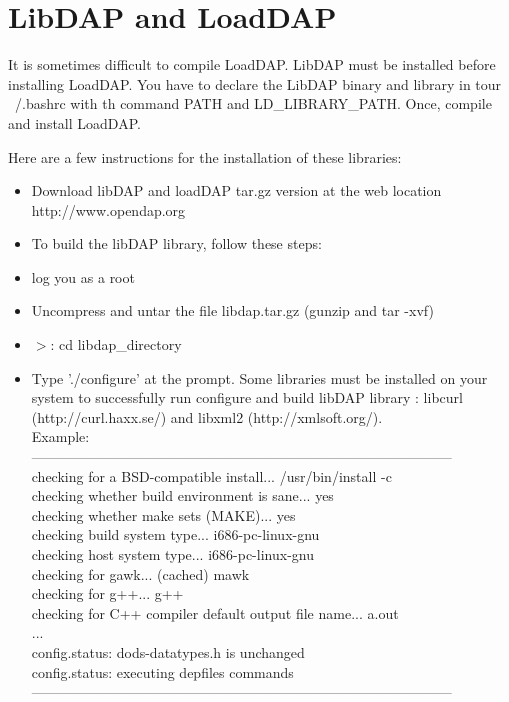 \section{LibDAP and  LoadDAP}\label{sec:libdap}
It is sometimes difficult to compile LoadDAP.  LibDAP must be installed before
installing LoadDAP. You have to declare the LibDAP binary and library in tour
~/.bashrc with th command PATH and LD\_LIBRARY\_PATH. Once, compile and install
LoadDAP.

Here are a few instructions for the installation of these libraries:\\
\begin{itemize}
\item Download libDAP and loadDAP tar.gz version at the web location
http://www.opendap.org
\item To build the libDAP library, follow these steps:\\
\item log you as a root
\item Uncompress and untar the file libdap.tar.gz (gunzip and tar -xvf)
\item $>$: cd libdap\_directory
\item Type './configure' at the prompt. Some libraries must be installed 
on your system to successfully run configure and build libDAP library : libcurl 
(http://curl.haxx.se/) and libxml2 (http://xmlsoft.org/).\\
Example:\\
------------------------------------------------------------------------------------------\\
checking for a BSD-compatible install... /usr/bin/install -c\\
checking whether build environment is sane... yes\\
checking whether make sets (MAKE)... yes\\
checking build system type... i686-pc-linux-gnu\\
checking host system type... i686-pc-linux-gnu\\
checking for gawk... (cached) mawk\\
checking for g++... g++\\
checking for C++ compiler default output file name... a.out\\
...\\
config.status: dods-datatypes.h is unchanged\\
config.status: executing depfiles commands\\
------------------------------------------------------------------------------------------\\

\end{itemize}
